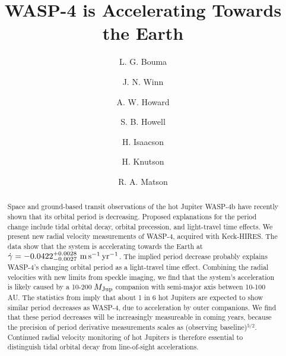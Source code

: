 \documentclass[12pt,twocolumn,tighten]{aastex62}
\begin{document}

\title{WASP-4 is Accelerating Towards the Earth}


%
%
\author[0000-0002-0514-5538]{L. G. Bouma}
%
\author[0000-0002-4265-047X]{J. N. Winn}

%
%
\author[0000-0001-8638-0320]{A. W. Howard}
%
\author{S. B. Howell}
%
\author[0000-0002-0531-1073]{H. Isaacson}
%
\author{H. Knutson}
%
\author{R. A. Matson}
%

\begin{abstract}
  Space and ground-based transit observations of the hot Jupiter
  WASP-4b have recently shown that its orbital period is decreasing.
  Proposed explanations for the period change include tidal orbital
  decay, orbital precession, and light-travel time effects.  We
  present new radial velocity measurements of WASP-4, acquired with
  Keck-HIRES.  The data show that the system is accelerating towards
  the Earth at $\dot{\gamma} = -0.0422^{+0.0028}_{-0.0027}\ {\rm
  m}\,{\rm s}^{-1}\,{\rm yr}^{-1}$.  The implied period decrease
  probably explains WASP-4's changing orbital period as a light-travel
  time effect.  Combining the radial velocities with new limits from
  speckle imaging, we find that the system's acceleration is likely
  caused by a 10-200$\,M_{\rm Jup}$ companion with semi-major axis
  between 10-100$\,$AU.  The statistics from
  \citet{knutson_friends_2014} imply that about 1 in 6 hot Jupiters
  are expected to show similar period decreases as WASP-4, due to
  acceleration by outer companions.  We find that these period
  decreases will be increasingly measureable in coming years, because
  the precision of period derivative measurements scales as
  (observing baseline)$^{5/2}$.  Continued radial velocity
  monitoring of hot Jupiters is therefore essential to distinguish
  tidal orbital decay from line-of-sight accelerations.
\end{abstract}
\end{document}
